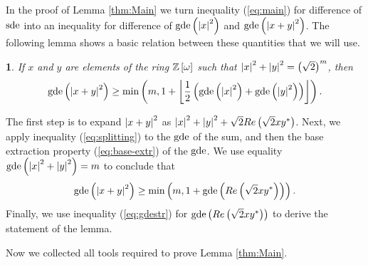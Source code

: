 \documentclass[english,journal]{extarticle}
\makeatletter
\theoremstyle{plain}
\theoremstyle{plain}
\theoremstyle{plain}
\newtheorem{lem}{\protect\lemmaname}
\theoremstyle{definition}
\theoremstyle{plain}
\newenvironment{proof}[1][\proofname]{\par
     \normalfont\topsep6\p@\@plus6\p@\relax
     \trivlist
     \itemindent\parindent
     \item[\hskip\labelsep
           \scshape
       #1]\ignorespaces
   }{%
     \endtrivlist\@endpefalse
   }
\providecommand{\proofname}{Proof}
\theoremstyle{plain}
\providecommand{\lemmaname}{\inputencoding{latin9}Lemma}
\makeatother
\begin{document}
In the proof of Lemma \ref{thm:Main} we turn inequality (\ref{eq:main})
for difference of $\mathrm{sde}$ into an inequality for difference of $\mathbf{\mathrm{gde}}\left(\left|x\right|^{2}\right)$
and $\mathbf{\mathrm{gde}}\left(\left|x+y\right|^{2}\right)$.  The following lemma shows a basic relation
between these quantities that we will use.
\begin{lem}
\label{lem:ineq}If $x$ and $y$ are elements of the ring $\mathbb{Z}\left[\omega\right]$ such that $\left|x\right|^{2}+\left|y\right|^{2}=\left(\sqrt{2}\right)^{m}$,
then 
\[
\mathbf{\mathrm{gde}}\left(\left|x+y\right|^{2}\right)\ge\min\left(m,1+\left\lfloor
\frac{1}{2}\left(\mathbf{\mathrm{gde}}\left(\left|x\right|^{2}\right)+\mathbf{\mathrm{gde}}\left(\left|y\right|^{2}\right)\right)\right\rfloor \right).
\]
\end{lem}
\begin{proof}
The first step is to expand $\left|x+y\right|^{2}$ as $\left|x\right|^{2}+\left|y\right|^{2}+\sqrt{2}Re\left(\sqrt{2}xy^{\ast}\right)$.
Next, we apply inequality (\ref{eq:splitting}) to the $\mathbf{\mathrm{gde}}$ of the sum,
and then the base extraction property (\ref{eq:base-extr}) of the $\mathbf{\mathrm{gde}}$.
We use equality $\mathbf{\mathrm{gde}}\left(\left|x\right|^{2}+\left|y\right|^{2}\right)=m$ to conclude that
\[
\mathbf{\mathrm{gde}}\left(\left|x+y\right|^{2}\right)\ge\min\left(m,1+\mathbf{\mathrm{gde}}\left(Re\left(\sqrt{2}xy^{\ast}
\right)\right)\right).
\]
Finally, we use inequality (\ref{eq:gdestr}) for
$\mathbf{\mathrm{gde}}\left(Re\left(\sqrt{2}xy^{\ast}\right)\right)$
to derive the statement of the lemma.
\end{proof}

Now we collected all tools required to prove Lemma \ref{thm:Main}.
\end{document}
